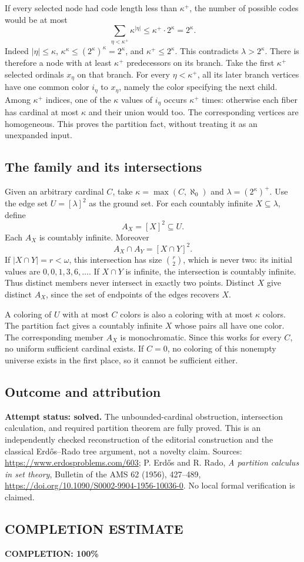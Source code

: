 If every selected node had code length less than $\kappa^+$, the number of possible codes would be at most
\[
\sum_{\eta<\kappa^+}\kappa^{|\eta|}
\leq\kappa^+\cdot2^\kappa=2^\kappa.
\tag{1}
\]
Indeed $|\eta|\leq\kappa$, $\kappa^\kappa\leq(2^\kappa)^\kappa=2^\kappa$, and $\kappa^+\leq2^\kappa$. This contradicts $\lambda>2^\kappa$. There is therefore a node with at least $\kappa^+$ predecessors on its branch. Take the first $\kappa^+$ selected ordinals $x_\eta$ on that branch.
For every $\eta<\kappa^+$, all its later branch vertices have one common color $i_\eta$ to $x_\eta$, namely the color specifying the next child. Among $\kappa^+$ indices, one of the $\kappa$ values of $i_\eta$ occurs $\kappa^+$ times: otherwise each fiber has cardinal at most $\kappa$ and their union would too. The corresponding vertices are homogeneous. This proves the partition fact, without treating it as an unexpanded input.

\subsection*{The family and its intersections}
Given an arbitrary cardinal $C$, take $\kappa=\max(C,\aleph_0)$ and $\lambda=(2^\kappa)^+$. Use the edge set $U=[\lambda]^2$ as the ground set. For each countably infinite $X\subseteq\lambda$, define
\[A_X=[X]^2\subseteq U.
\]
Each $A_X$ is countably infinite. Moreover
\[A_X\cap A_Y=[X\cap Y]^2.
\]
If $|X\cap Y|=r<\omega$, this intersection has size $\binom r2$, which is never two: its initial values are $0,0,1,3,6,\ldots$. If $X\cap Y$ is infinite, the intersection is countably infinite. Thus distinct members never intersect in exactly two points. Distinct $X$ give distinct $A_X$, since the set of endpoints of the edges recovers $X$.

A coloring of $U$ with at most $C$ colors is also a coloring with at most $\kappa$ colors. The partition fact gives a countably infinite $X$ whose pairs all have one color. The corresponding member $A_X$ is monochromatic. Since this works for every $C$, no uniform sufficient cardinal exists. If $C=0$, no coloring of this nonempty universe exists in the first place, so it cannot be sufficient either.

\subsection*{Outcome and attribution}
\textbf{Attempt status: solved.} The unbounded-cardinal obstruction, intersection calculation, and required partition theorem are fully proved. This is an independently checked reconstruction of the editorial construction and the classical Erd\H{o}s--Rado tree argument, not a novelty claim. Sources: \url{https://www.erdosproblems.com/603}; P. Erd\H{o}s and R. Rado, \emph{A partition calculus in set theory}, Bulletin of the AMS 62 (1956), 427--489, \url{https://doi.org/10.1090/S0002-9904-1956-10036-0}. No local formal verification is claimed.

\subsection*{COMPLETION ESTIMATE}
\textbf{COMPLETION: 100\%}
